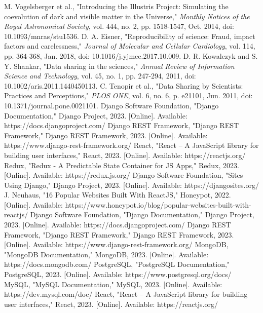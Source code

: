 \documentclass[conference]{IEEEtran}
\begin{document}
\begin{thebibliography}{00}
 M. Vogelsberger et al., "Introducing the Illustris Project: Simulating the coevolution of dark and visible matter in the Universe," \textit{Monthly Notices of the Royal Astronomical Society}, vol. 444, no. 2, pp. 1518-1547, Oct. 2014, doi: 10.1093/mnras/stu1536.
 D. A. Eisner, "Reproducibility of science: Fraud, impact factors and carelessness," \textit{Journal of Molecular and Cellular Cardiology}, vol. 114, pp. 364-368, Jan. 2018, doi: 10.1016/j.yjmcc.2017.10.009.
 D. R. Kowalczyk and S. Y. Shankar, "Data sharing in the sciences," \textit{Annual Review of Information Science and Technology}, vol. 45, no. 1, pp. 247-294, 2011, doi: 10.1002/aris.2011.1440450113.
 C. Tenopir et al., "Data Sharing by Scientists: Practices and Perceptions," \textit{PLOS ONE}, vol. 6, no. 6, p. e21101, Jun. 2011, doi: 10.1371/journal.pone.0021101.
 Django Software Foundation, "Django Documentation," Django Project, 2023. [Online]. Available: https://docs.djangoproject.com/
 Django REST Framework, "Django REST Framework," Django REST Framework, 2023. [Online]. Available: https://www.django-rest-framework.org/
 React, "React – A JavaScript library for building user interfaces," React, 2023. [Online]. Available: https://reactjs.org/
 Redux, "Redux - A Predictable State Container for JS Apps," Redux, 2023. [Online]. Available: https://redux.js.org/
 Django Software Foundation, "Sites Using Django," Django Project, 2023. [Online]. Available: https://djangosites.org/
 J. Neuhaus, "16 Popular Websites Built With ReactJS," Honeypot, 2022. [Online]. Available: https://www.honeypot.io/blog/popular-websites-built-with-reactjs/
 Django Software Foundation, "Django Documentation," Django Project, 2023. [Online]. Available: https://docs.djangoproject.com/
 Django REST Framework, "Django REST Framework," Django REST Framework, 2023. [Online]. Available: https://www.django-rest-framework.org/
 MongoDB, "MongoDB Documentation," MongoDB, 2023. [Online]. Available: https://docs.mongodb.com/
 PostgreSQL, "PostgreSQL Documentation," PostgreSQL, 2023. [Online]. Available: https://www.postgresql.org/docs/
 MySQL, "MySQL Documentation," MySQL, 2023. [Online]. Available: https://dev.mysql.com/doc/
 React, "React – A JavaScript library for building user interfaces," React, 2023. [Online]. Available: https://reactjs.org/

\end{thebibliography}
\end{document}
